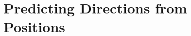 \documentclass[11pt]{gsasthesis} %
\begin{document}
% 

\chapter{Predicting Directions from Positions}\label{ch:2}


% 

% 

% 



\begin{singlespacing}
\renewcommand{\bibname}{References}

% 
% 

\end{singlespacing}

% 
\end{document}

